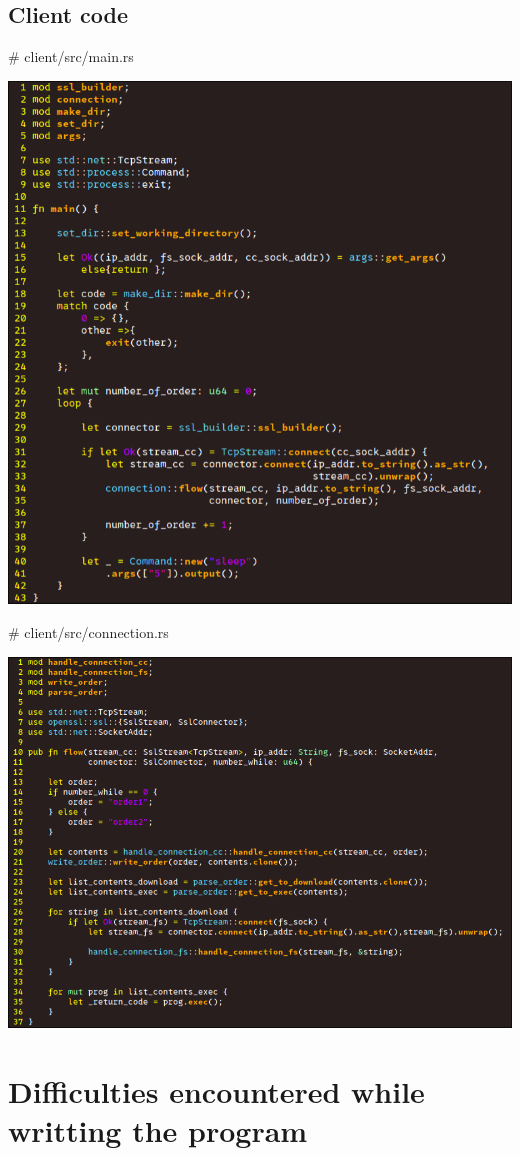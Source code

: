 \documentclass[../main.tex]{subfiles}
\begin{document}
    
	\vspace{10pt}

	\subsection{Client code}

    \# client/src/main.rs

    \includegraphics[width=450pt]{client_main.png}

    \# client/src/connection.rs

    \includegraphics[width=450pt]{client_flow.png}

	\vspace{10pt}

	\section{Difficulties encountered while writting the program}
\end{document}
